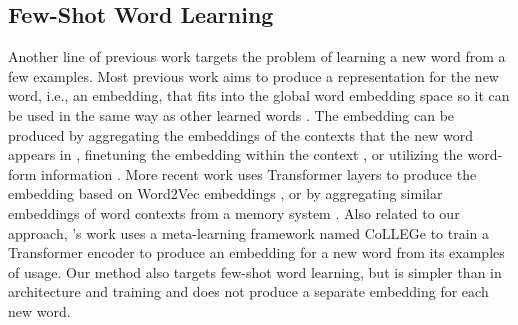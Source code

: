 \documentclass{article}
\begin{document}
\subsection{Few-Shot Word Learning}
\label{sec:related-work-few-shot-word-learning}
Another line of previous work targets the problem of learning a new word from a few examples.
Most previous work aims to produce a representation for the new word, i.e., an embedding, that fits into the global word embedding space so it can be used in the same way as other learned words \citep{Mikolov2013EfficientEO,Pennington2014GloVeGV}. The embedding can be produced by aggregating the embeddings of the contexts that the new word appears in \citep{Lazaridou2017MultimodalWM,khodak-etal-2018-la}, finetuning the embedding within the context \citep{herbelot-baroni-2017-high,Lampinen2017OneshotAF,hewitt2021initializing,kim-smolensky-2021-testing}, or utilizing the word-form information \citep{luong-etal-2013-better,schick2019learning}. %
More recent work uses Transformer layers to produce the embedding based on Word2Vec embeddings \citep[HiCE]{hu-etal-2019-shot}, or by aggregating similar embeddings of word contexts from a memory system \citep[Mem2Vec]{sun-etal-2018-memory}.
Also related to our approach, \citeauthor{Teehan2024CoLLEGeCE}'s \citeyearpar{Teehan2024CoLLEGeCE} work uses a meta-learning framework named CoLLEGe to train a Transformer encoder to produce an embedding for a new word from its examples of usage.
Our method also targets few-shot word learning, but is simpler than \citet{Teehan2024CoLLEGeCE} in architecture and training and does not produce a separate embedding for each new word.
\end{document}
